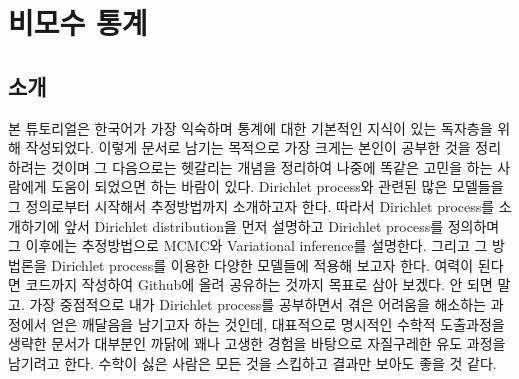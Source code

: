 \documentclass[a4paper, 10pt]{book}
\begin{document}
\nocite{*}

\chapter{비모수 통계}
\section{소개}
  본 튜토리얼은 한국어가 가장 익숙하며 통계에 대한 기본적인 지식이 있는 독자층을 위해 작성되었다. 이렇게 문서로 남기는 목적으로 가장 크게는 본인이 공부한 것을 정리하려는 것이며 그 다음으로는 헷갈리는 개념을 정리하여 나중에 똑같은 고민을 하는 사람에게 도움이 되었으면 하는 바람이 있다. Dirichlet process와 관련된 많은 모델들을 그 정의로부터 시작해서 추정방법까지 소개하고자 한다. 따라서 Dirichlet process를 소개하기에 앞서 Dirichlet distribution을 먼저 설명하고 Dirichlet process를 정의하며 그 이후에는 추정방법으로 MCMC와 Variational inference를 설명한다. 그리고 그 방법론을 Dirichlet process를 이용한 다양한 모델들에 적용해 보고자 한다. 여력이 된다면 코드까지 작성하여 Github에 올려 공유하는 것까지 목표로 삼아 보겠다. 안 되면 말고. 가장 중점적으로 내가 Dirichlet process를 공부하면서 겪은 어려움을 해소하는 과정에서 얻은 깨달음을 남기고자 하는 것인데, 대표적으로 명시적인 수학적 도출과정을 생략한 문서가 대부분인 까닭에 꽤나 고생한 경험을 바탕으로 자질구레한 유도 과정을 남기려고 한다. 수학이 싫은 사람은 모든 것을 스킵하고 결과만 보아도 좋을 것 같다.
\end{document}
